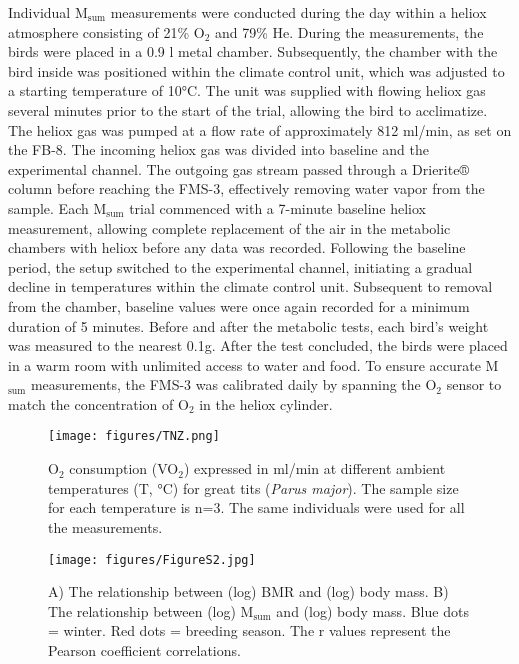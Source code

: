 \documentclass[10pt, twoside]{book} %
\begin{document}
Individual M$_{\text{sum}}$ measurements were conducted during the day within a heliox atmosphere consisting of 21\% O$_{\text{2}}$ and 79\% He. During the measurements, the birds were placed in a 0.9 l metal chamber. Subsequently, the chamber with the bird inside was positioned within the climate control unit, which was adjusted to a starting temperature of 10°C. The unit was supplied with flowing heliox gas several minutes prior to the start of the trial, allowing the bird to acclimatize. The heliox gas was pumped at a flow rate of approximately 812 ml/min, as set on the FB-8. The incoming heliox gas was divided into baseline and the experimental channel. The outgoing gas stream passed through a Drierite® column before reaching the FMS-3, effectively removing water vapor from the sample. Each M$_{\text{sum}}$ trial commenced with a 7-minute baseline heliox measurement, allowing complete replacement of the air in the metabolic chambers with heliox before any data was recorded. Following the baseline period, the setup switched to the experimental channel, initiating a gradual decline in temperatures within the climate control unit. Subsequent to removal from the chamber, baseline values were once again recorded for a minimum duration of 5 minutes. Before and after the metabolic tests, each bird's weight was measured to the nearest 0.1g. After the test concluded, the birds were placed in a warm room with unlimited access to water and food. To ensure accurate M$_{\text{sum}}$ measurements, the FMS-3 was calibrated daily by spanning the O$_{\text{2}}$ sensor to match the concentration of O$_{\text{2}}$ in the heliox cylinder.

\clearpage

\renewcommand{\thefigure}{4.\arabic{figure}}
	\begin{figure}[h!]
		\begin{center}
			\texttt{[image: figures/TNZ.png]}
		\end{center}
		\begin{footnotesize}
			\caption{\footnotesize O$_{\text{2}}$ consumption (VO$_{\text{2}}$) expressed in ml/min at different ambient temperatures (T, °C) for great tits (\textit{Parus major}). The sample size for each temperature is n=3. The same individuals were used for all the measurements.\label{fig4.1}}
		\end{footnotesize}
	\end{figure}
\clearpage

\renewcommand{\thefigure}{4.\arabic{figure}}
	\begin{figure}[h!]
		\begin{center}
			\texttt{[image: figures/FigureS2.jpg]}
		\end{center}
		\begin{footnotesize}
			\caption{\footnotesize A) The relationship between (log) BMR and (log) body mass. B) The relationship between (log) M$_{\text{sum}}$ and (log) body mass. Blue dots = winter. Red dots = breeding season. The r values represent the Pearson coefficient correlations.\label{fig4.1}}
		\end{footnotesize}
	\end{figure}
\clearpage
\end{document}

